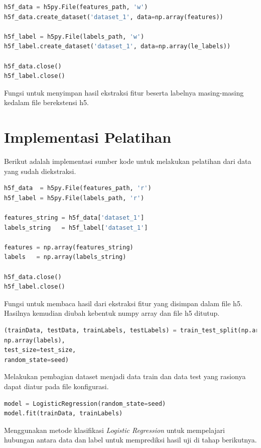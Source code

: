 \begin{lstlisting}[language=python, caption=Menyimpan hasil ekstraksi fitur, label=code:save_h5, firstnumber=149]
h5f_data = h5py.File(features_path, 'w')
h5f_data.create_dataset('dataset_1', data=np.array(features))

h5f_label = h5py.File(labels_path, 'w')
h5f_label.create_dataset('dataset_1', data=np.array(le_labels))

h5f_data.close()
h5f_label.close() 
\end{lstlisting}

\par Fungsi untuk menyimpan hasil ekstraksi fitur beserta labelnya masing-masing kedalam file berekstensi h5.

\section{Implementasi Pelatihan}
\par Berikut adalah implementasi sumber kode untuk melakukan pelatihan dari data yang sudah diekstraksi. 

\begin{lstlisting}[language=python, caption=Membaca file hasil ekstraksi fitur, label=code:read_h5, firstnumber=34]
h5f_data  = h5py.File(features_path, 'r')
h5f_label = h5py.File(labels_path, 'r')

features_string = h5f_data['dataset_1']
labels_string   = h5f_label['dataset_1']

features = np.array(features_string)
labels   = np.array(labels_string)

h5f_data.close()
h5f_label.close()
\end{lstlisting}

Fungsi untuk membaca hasil dari ekstraksi fitur yang disimpan dalam file h5. Hasilnya kemudian diubah kebentuk numpy array dan file h5 ditutup.

\begin{lstlisting}[language=python, caption=Membagi data test dan data train, label=code:train_test_split, firstnumber=52]
(trainData, testData, trainLabels, testLabels) = train_test_split(np.array(features),
np.array(labels),
test_size=test_size,
random_state=seed)
\end{lstlisting}

\par Melakukan pembagian dataset menjadi data train dan data test yang rasionya dapat diatur pada file konfigurasi.

\begin{lstlisting}[language=python, caption=Penyesuaian dengan \textit{Logistic Regression}, label=code:logistic, firstnumber=65]
model = LogisticRegression(random_state=seed)
model.fit(trainData, trainLabels)
\end{lstlisting}
\par Menggunakan metode klasifikasi \textit{Logistic Regression} untuk mempelajari hubungan antara data dan label untuk memprediksi hasil uji di tahap berikutnya.

